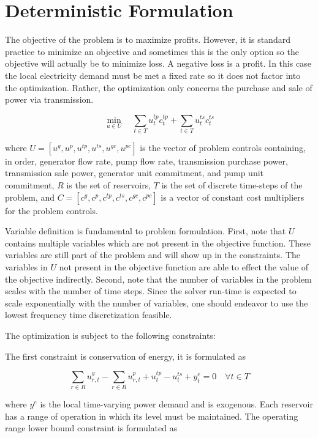 \documentclass[12pt]{article}
\begin{document}
\section*{Deterministic Formulation}

The objective of the problem is to maximize profits. However, it is standard practice to minimize an objective and sometimes this is the only option so the objective will actually be to minimize loss. A negative loss is a profit. In this case the local electricity demand must be met a fixed rate so it does not factor into the optimization. Rather, the optimization only concerns the purchase and sale of power via transmission.

\begin{equation}
	\min_{u\in U}\quad
	\sum_{t\in T}u_{t}^{tp}c_{t}^{tp}+
	\sum_{t\in T}u_{t}^{ts}c_{t}^{ts}
\end{equation}

where $U=[u^g,u^p,u^{tp},u^{ts},u^{gc},u^{pc}]$ is the vector of problem controls containing, in order, generator flow rate, pump flow rate, transmission purchase power, transmission sale power, generator unit commitment, and pump unit commitment, $R$ is the set of reservoirs, $T$ is the set of discrete time-steps of the problem, and $C=[c^g,c^p,c^{tp},c^{ts},c^{gc},c^{pc}]$ is a vector of constant cost multipliers for the problem controls.

Variable definition is fundamental to problem formulation. First, note that $U$ contains multiple variables which are not present in the objective function. These variables are still part of the problem and will show up in the constraints. The variables in $U$ not present in the objective function are able to effect the value of the objective indirectly. Second, note that the number of variables in the problem scales with the number of time steps. Since the solver run-time is expected to scale exponentially with the number of variables, one should endeavor to use the lowest frequency time discretization feasible.

The optimization is subject to the following constraints:

The first constraint is conservation of energy, it is formulated as

\begin{equation}
	\sum_{r\in R}u_{r,t}^{g}-
	\sum_{r\in R}u_{r,t}^{p}+
	u_{t}^{tp}-
	u_{t}^{ts}+
	y_{t}^{e}=0\quad \forall t\in T\label{eq:coe}
\end{equation}

where $y^e$ is the local time-varying power demand and is exogenous. Each reservoir has a range of operation in which its level must be maintained. The operating range lower bound constraint is formulated as
\end{document}
